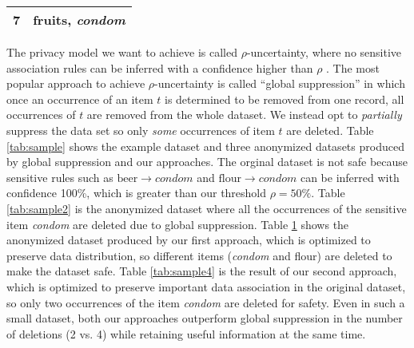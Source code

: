 \begin{table}[th]
{{\begin{tabular}{|c|l|}
7& fruits, {\em condom}  \\ \hline
\end{tabular}
\label{tab:sample3}
}
}
\end{table}

The privacy model we want to achieve is called $\rho$-uncertainty, where
no sensitive association rules can be inferred with a confidence higher than
$\rho$ \cite{Cao:2010:rho}.
%
The most popular approach to achieve $\rho$-uncertainty is called ``global
suppression'' \cite{Cao:2010:rho} in which once an occurrence of an item $t$ is
determined to be removed from one record, all occurrences of $t$ are
removed from the whole dataset. We instead opt to {\em partially}
suppress the data set so only {\em some} occurrences of item $t$ are
deleted.
Table \ref{tab:sample} shows the example dataset
and three anonymized datasets produced by global suppression and our approaches.
The orginal dataset is not safe because sensitive rules such as
$\text{beer} \rightarrow condom$ and $\text{flour} \rightarrow condom$
can be inferred with confidence 100\%, which is greater than our threshold $\rho=50\%$.
Table \ref{tab:sample2} is the anonymized dataset where all the occurrences of
the sensitive item {\em condom} are deleted due to global suppression.
Table \ref{tab:sample3} shows the anonymized dataset produced by our first
approach, which is optimized to preserve data distribution, so different
items ({\em condom} and flour) are deleted to make the dataset safe.
Table \ref{tab:sample4} is the result of our second approach, which is optimized
to preserve important data association in the original dataset, so only
two occurrences of the item {\em condom} are deleted for safety.
Even in such a small dataset, both our approaches outperform global suppression
in the number of deletions (2 vs. 4) while retaining useful information at the same time.

